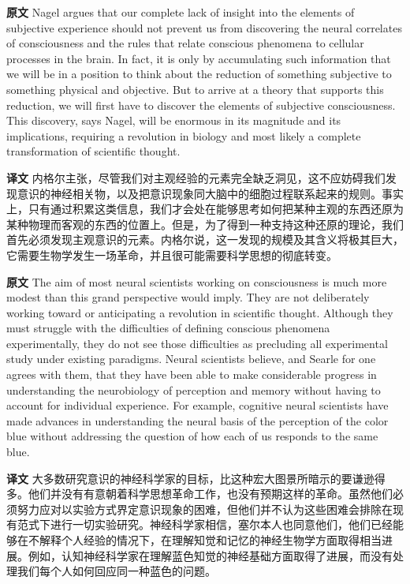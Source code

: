 \documentclass[UTF8,zihao=-4]{ctexart}
\newcommand{\BodyFont}{\fontsize{10.5pt}{15.5pt}\selectfont}
\newcommand{\origlabel}{\textbf{原文}\quad}
\newcommand{\translabel}{\textbf{译文}\quad}
\newenvironment{enblock}{\par\noindent\begingroup\BodyFont\origlabel}{\par\endgroup}
\newenvironment{zhblock}{\par\noindent\begingroup\BodyFont\translabel}{\par\endgroup\vspace{0.35em}}
\begin{document}
\begin{enblock}
Nagel argues that our complete lack of insight into the elements of subjective experience should not prevent us from discovering the neural correlates of consciousness and the rules that relate conscious phenomena to cellular processes in the brain. In fact, it is only by accumulating such information that we will be in a position to think about the reduction of something subjective to something physical and objective. But to arrive at a theory that supports this reduction, we will first have to discover the elements of subjective consciousness. This discovery, says Nagel, will be enormous in its magnitude and its implications, requiring a revolution in biology and most likely a complete transformation of scientific thought.
\end{enblock}
\begin{zhblock}
内格尔主张，尽管我们对主观经验的元素完全缺乏洞见，这不应妨碍我们发现意识的神经相关物，以及把意识现象同大脑中的细胞过程联系起来的规则。事实上，只有通过积累这类信息，我们才会处在能够思考如何把某种主观的东西还原为某种物理而客观的东西的位置上。但是，为了得到一种支持这种还原的理论，我们首先必须发现主观意识的元素。内格尔说，这一发现的规模及其含义将极其巨大，它需要生物学发生一场革命，并且很可能需要科学思想的彻底转变。\end{zhblock}

\begin{enblock}
The aim of most neural scientists working on consciousness is much more modest than this grand perspective would imply. They are not deliberately working toward or anticipating a revolution in scientific thought. Although they must struggle with the difficulties of defining conscious phenomena experimentally, they do not see those difficulties as precluding all experimental study under existing paradigms. Neural scientists believe, and Searle for one agrees with them, that they have been able to make considerable progress in understanding the neurobiology of perception and memory without having to account for individual experience. For example, cognitive neural scientists have made advances in understanding the neural basis of the perception of the color blue without addressing the question of how each of us responds to the same blue.
\end{enblock}
\begin{zhblock}
大多数研究意识的神经科学家的目标，比这种宏大图景所暗示的要谦逊得多。他们并没有有意朝着科学思想革命工作，也没有预期这样的革命。虽然他们必须努力应对以实验方式界定意识现象的困难，但他们并不认为这些困难会排除在现有范式下进行一切实验研究。神经科学家相信，塞尔本人也同意他们，他们已经能够在不解释个人经验的情况下，在理解知觉和记忆的神经生物学方面取得相当进展。例如，认知神经科学家在理解蓝色知觉的神经基础方面取得了进展，而没有处理我们每个人如何回应同一种蓝色的问题。\end{zhblock}
\end{document}
